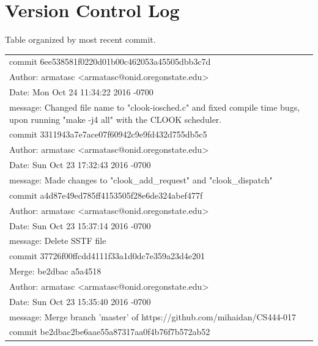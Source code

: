 \documentclass[letterpaper,10pt,onecolumn]{IEEEtran}
\begin{document}
    \vspace{6mm}
    
    
    \section*{Version Control Log}
        \begin{center}
            Table organized by most recent commit.
        \end{center}
        
        \vspace{1mm}
        
    \def\arraystretch{1.1}
    \begin{tabular}{ | p{16.75cm} | }
        \hline
        commit 6ee538581f0220d01b00c462053a45505dbb3c7d \\
        Author: armatasc <armatasc@onid.oregonstate.edu> \\
        Date:   Mon Oct 24 11:34:22 2016 -0700 \\ 
        message: Changed file name to "clook-iosched.c" and fixed compile time bugs, upon running "make -j4 all" with the CLOOK scheduler. \\
        \hline
        commit 3311943a7e7ace07f60942c9e9fd432d755db5c5 \\
        Author: armatasc <armatasc@onid.oregonstate.edu> \\
        Date:   Sun Oct 23 17:32:43 2016 -0700 \\
        message: Made changes to "clook\_add\_request" and "clook\_dispatch" \\
        \hline
        commit a4d87e49ed785ff4153505f28e6de324abef477f \\
        Author: armatasc <armatasc@onid.oregonstate.edu> \\
        Date:   Sun Oct 23 15:37:14 2016 -0700 \\
        message: Delete SSTF file \\
        \hline
        commit 37726f00ffcdd4111f33a1d0dc7e359a23d4e201 \\
        Merge: be2dbac a5a4518 \\
        Author: armatasc <armatasc@onid.oregonstate.edu> \\
        Date:   Sun Oct 23 15:35:40 2016 -0700 \\
        message: Merge branch 'master' of https://github.com/mihaidan/CS444-017 \\
        \hline
        commit be2dbac2be6aae55a87317aa0f4b76f7b572ab52 \\

\end{tabular}
\end{document}
